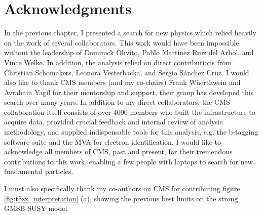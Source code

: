   \clearpage
  \section{Acknowledgments}

  In the previous chapter, I presented a search for new physics which relied heavily on the work of several collaborators. This work would have been impossible without the leadership of Dominick Olivito, Pablo Martinez Ruiz del Arbol, and Vince Welke. In addition, the analysis relied on direct contributions from Christian Schomakers, Leonora Vesterbacka, and Sergio Sánchez Cruz. I would also like to thank CMS members (and my co-chairs) Frank W\"uerthwein and Avraham Yagil for their mentorship and support, their group has developed this search over many years. In addition to my direct collaborators, the CMS collaboration itself consists of over 4000 members who built the infrastructure to acquire data, provided crucial feedback and internal review of analysis methodology, and supplied indispensable tools for this analysis, e.g. the b-tagging software suite and the MVA for electron identification. I would like to acknowledge all members of CMS, past and present, for their tremendous contributions to this work, enabling a few people with laptops to search for new fundamental particles.

  I must also specifically thank my co-authors on CMS for contributing figure \ref{fig:t5zz_interpretation} (a), showing the previous best limits on the strong GMSB SUSY model.


